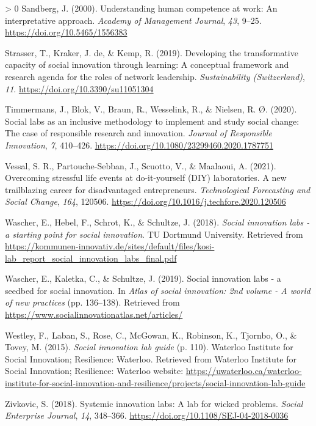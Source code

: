 \documentclass[]{elsarticle} %
\newlength{\cslhangindent}
\newenvironment{CSLReferences}[3] %
 {%
  \setlength{\parindent}{0pt}
  \ifodd #1 \everypar{\setlength{\hangindent}{\cslhangindent}}\ignorespaces\fi
  \ifnum #2 > 0
  \setlength{\parskip}{#2\baselineskip}
  \fi
 }%
 {}
\begin{document}
\begin{CSLReferences}{1}{0}
\leavevmode\hypertarget{ref-Sandberg2000}{}%
Sandberg, J. (2000). Understanding human competence at work: An
interpretative approach. \emph{Academy of Management Journal},
\emph{43}, 9--25. \url{https://doi.org/10.5465/1556383}

\leavevmode\hypertarget{ref-Strasser2019}{}%
Strasser, T., Kraker, J. de, \& Kemp, R. (2019). Developing the
transformative capacity of social innovation through learning: A
conceptual framework and research agenda for the roles of network
leadership. \emph{Sustainability (Switzerland)}, \emph{11}.
\url{https://doi.org/10.3390/su11051304}

\leavevmode\hypertarget{ref-Timmermans2020}{}%
Timmermans, J., Blok, V., Braun, R., Wesselink, R., \& Nielsen, R. Ø.
(2020). Social labs as an inclusive methodology to implement and study
social change: The case of responsible research and innovation.
\emph{Journal of Responsible Innovation}, \emph{7}, 410--426.
\url{https://doi.org/10.1080/23299460.2020.1787751}

\leavevmode\hypertarget{ref-RezaeeVessal2021}{}%
Vessal, S. R., Partouche-Sebban, J., Scuotto, V., \& Maalaoui, A.
(2021). Overcoming stressful life events at do-it-yourself (DIY)
laboratories. A new trailblazing career for disadvantaged entrepreneurs.
\emph{Technological Forecasting and Social Change}, \emph{164}, 120506.
\url{https://doi.org/10.1016/j.techfore.2020.120506}

\leavevmode\hypertarget{ref-Wascher2018}{}%
Wascher, E., Hebel, F., Schrot, K., \& Schultze, J. (2018). \emph{Social
innovation labs - a starting point for social innovation}. TU Dortmund
University. Retrieved from
\url{https://kommunen-innovativ.de/sites/default/files/kosi-lab_report_social_innovation_labs_final.pdf}

\leavevmode\hypertarget{ref-Wascher2019}{}%
Wascher, E., Kaletka, C., \& Schultze, J. (2019). Social innovation labs
- a seedbed for social innovation. In \emph{Atlas of social innovation:
2nd volume - A world of new practices} (pp. 136--138). Retrieved from
\url{https://www.socialinnovationatlas.net/articles/}

\leavevmode\hypertarget{ref-Westley2015}{}%
Westley, F., Laban, S., Rose, C., McGowan, K., Robinson, K., Tjornbo,
O., \& Tovey, M. (2015). \emph{Social innovation lab guide} (p. 110).
Waterloo Institute for Social Innovation; Resilience: Waterloo.
Retrieved from Waterloo Institute for Social Innovation; Resilience:
Waterloo website:
\url{https://uwaterloo.ca/waterloo-institute-for-social-innovation-and-resilience/projects/social-innovation-lab-guide}

\leavevmode\hypertarget{ref-Zivkovic2018}{}%
Zivkovic, S. (2018). Systemic innovation labs: A lab for wicked
problems. \emph{Social Enterprise Journal}, \emph{14}, 348--366.
\url{https://doi.org/10.1108/SEJ-04-2018-0036}

\end{CSLReferences}
\end{document}
